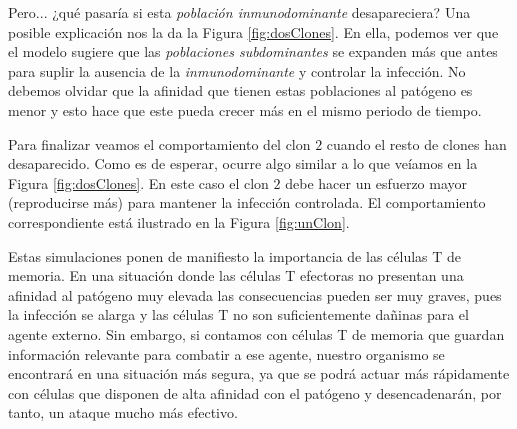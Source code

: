 Pero... ¿qué pasaría si esta \textit{población inmunodominante} desapareciera? Una posible explicación nos la da la Figura \ref{fig:dosClones}. En ella, podemos ver que el modelo sugiere que las \textit{poblaciones subdominantes} se expanden más que antes para suplir la ausencia de la \textit{inmunodominante} y controlar la infección. No debemos olvidar que la afinidad que tienen estas poblaciones al patógeno es menor y esto hace que este pueda crecer más en el mismo periodo de tiempo.



Para finalizar veamos el comportamiento del clon $2$ cuando el resto de clones han desaparecido. Como es de esperar, ocurre algo similar a lo que veíamos en la Figura \ref{fig:dosClones}. En este caso el clon $2$ debe hacer un esfuerzo mayor (reproducirse más) para mantener la infección controlada. El comportamiento correspondiente está ilustrado en la Figura \ref{fig:unClon}.

Estas simulaciones ponen de manifiesto la importancia de las células T de memoria. En una situación donde las células T efectoras no presentan una afinidad al patógeno muy elevada las consecuencias pueden ser muy graves, pues la infección se alarga y las células T no son suficientemente dañinas para el agente externo. Sin embargo, si contamos con células T de memoria que guardan información relevante para combatir a ese agente, nuestro organismo se encontrará en una situación más segura, ya que se podrá actuar más rápidamente con células que disponen de alta afinidad con el patógeno y desencadenarán, por tanto, un ataque mucho más efectivo.



